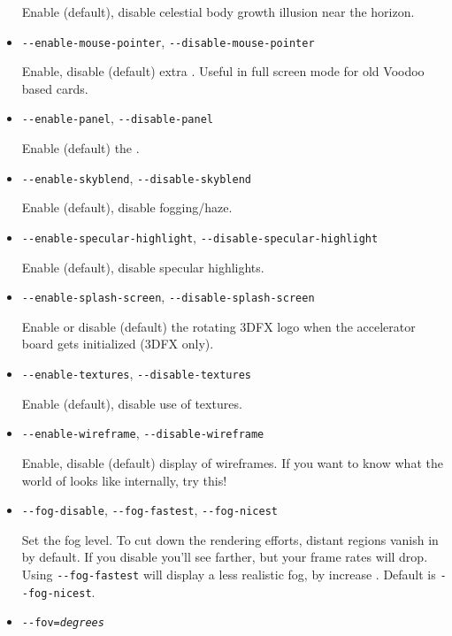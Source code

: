 \begin{itemize}
Enable (default), disable celestial body growth illusion near the horizon.

\item{\texttt{-$ $-enable-mouse-pointer}, \texttt{-$ $-disable-mouse-pointer}}

Enable, disable (default) extra . Useful in full screen mode for old Voodoo based cards.

\item{\texttt{-$ $-enable-panel}, \texttt{-$ $-disable-panel}}

Enable (default) the .

\item{\texttt{-$ $-enable-skyblend}, \texttt{-$ $-disable-skyblend}}

Enable (default), disable fogging/haze.

\item{\texttt{-$ $-enable-specular-highlight}, \texttt{-$ $-disable-specular-highlight}}

Enable (default), disable specular highlights.

\item{\texttt{-$ $-enable-splash-screen}, \texttt{-$ $-disable-splash-screen}}

Enable or disable (default) the rotating 3DFX logo when the accelerator board gets initialized (3DFX only).

\item{\texttt{-$ $-enable-textures}, \texttt{-$ $-disable-textures}}

Enable (default), disable use of textures.

\item{\texttt{-$ $-enable-wireframe}, \texttt{-$ $-disable-wireframe}}

Enable, disable (default) display of wireframes. If you want to know what the world of
\FlightGear{} looks like internally, try this!

\item{\texttt{-$ $-fog-disable}, \texttt{-$ $-fog-fastest}, \texttt{-$ $-fog-nicest}}

Set the fog level. To cut down the rendering efforts, distant regions vanish in  by default.
If you disable  you'll see farther, but your frame rates will drop. Using \texttt{-$ $-fog-fastest}
will display a less realistic fog, by increase . Default is \texttt{-$ $-fog-nicest}.

\item{\texttt{-$ $-fov={\it degrees}}}


\end{itemize}
